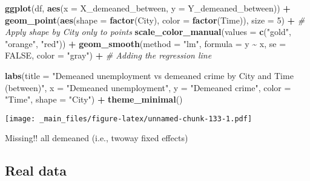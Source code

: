 \documentclass[
]{book}
\newenvironment{Shaded}{\begin{snugshade}}{\end{snugshade}}
\newcommand{\AttributeTok}[1]{\textcolor[rgb]{0.13,0.29,0.53}{#1}}
\newcommand{\CommentTok}[1]{\textcolor[rgb]{0.56,0.35,0.01}{\textit{#1}}}
\newcommand{\ConstantTok}[1]{\textcolor[rgb]{0.56,0.35,0.01}{#1}}
\newcommand{\DecValTok}[1]{\textcolor[rgb]{0.00,0.00,0.81}{#1}}
\newcommand{\FunctionTok}[1]{\textcolor[rgb]{0.13,0.29,0.53}{\textbf{#1}}}
\newcommand{\NormalTok}[1]{#1}
\newcommand{\SpecialCharTok}[1]{\textcolor[rgb]{0.81,0.36,0.00}{\textbf{#1}}}
\newcommand{\StringTok}[1]{\textcolor[rgb]{0.31,0.60,0.02}{#1}}
\begin{document}
\begin{Shaded}
\begin{Highlighting}[]
\FunctionTok{ggplot}\NormalTok{(df, }\FunctionTok{aes}\NormalTok{(}\AttributeTok{x =}\NormalTok{ X\_demeaned\_between, }\AttributeTok{y =}\NormalTok{ Y\_demeaned\_between)) }\SpecialCharTok{+}
  \FunctionTok{geom\_point}\NormalTok{(}\FunctionTok{aes}\NormalTok{(}\AttributeTok{shape =} \FunctionTok{factor}\NormalTok{(City), }\AttributeTok{color =} \FunctionTok{factor}\NormalTok{(Time)), }\AttributeTok{size =} \DecValTok{5}\NormalTok{) }\SpecialCharTok{+}  \CommentTok{\# Apply shape by City only to points}
  \FunctionTok{scale\_color\_manual}\NormalTok{(}\AttributeTok{values =} \FunctionTok{c}\NormalTok{(}\StringTok{"gold"}\NormalTok{, }\StringTok{"orange"}\NormalTok{, }\StringTok{"red"}\NormalTok{)) }\SpecialCharTok{+}
  \FunctionTok{geom\_smooth}\NormalTok{(}\AttributeTok{method =} \StringTok{"lm"}\NormalTok{, }\AttributeTok{formula =}\NormalTok{ y }\SpecialCharTok{\textasciitilde{}}\NormalTok{ x, }\AttributeTok{se =} \ConstantTok{FALSE}\NormalTok{, }\AttributeTok{color =} \StringTok{"gray"}\NormalTok{) }\SpecialCharTok{+}  \CommentTok{\# Adding the regression line}
  
  \FunctionTok{labs}\NormalTok{(}\AttributeTok{title =} \StringTok{"Demeaned unemployment vs demeaned crime by City and Time (between)"}\NormalTok{,}
       \AttributeTok{x =} \StringTok{"Demeaned unemployment"}\NormalTok{,}
       \AttributeTok{y =} \StringTok{"Demeaned crime"}\NormalTok{,}
       \AttributeTok{color =} \StringTok{"Time"}\NormalTok{,}
       \AttributeTok{shape =} \StringTok{"City"}\NormalTok{) }\SpecialCharTok{+}
  \FunctionTok{theme\_minimal}\NormalTok{()}
\end{Highlighting}
\end{Shaded}

\texttt{[image: \_main\_files/figure-latex/unnamed-chunk-133-1.pdf]}

{Missing!! all demeaned (i.e., twoway fixed effects)}

\hypertarget{real-data-2}{%
\subsection{Real data}\label{real-data-2}}
\end{document}
